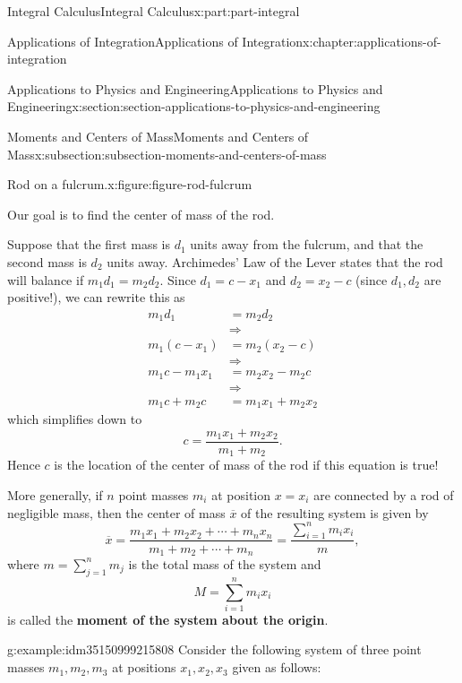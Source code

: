 \documentclass[twoside,10pt,]{tufte-book}
\newcommand{\terminology}[1]{\textbf{#1}}
\numberwithin{equation}{part}
\newcommand{\amp}{&}
\begin{document}
\begin{partptx}{Integral Calculus}{}{Integral Calculus}{}{}{x:part:part-integral}
\begin{chapterptx}{Applications of Integration}{}{Applications of Integration}{}{}{x:chapter:applications-of-integration}
\begin{sectionptx}{Applications to Physics and Engineering}{}{Applications to Physics and Engineering}{}{}{x:section:section-applications-to-physics-and-engineering}
\begin{subsectionptx}{Moments and Centers of Mass}{}{Moments and Centers of Mass}{}{}{x:subsection:subsection-moments-and-centers-of-mass}
\begin{figureptx}{Rod on a fulcrum.}{x:figure:figure-rod-fulcrum}{}
\begin{image}{0}{1}{0}
{
}%
\end{image}%
\tcblower
\end{figureptx}%
Our goal is to find the center of mass of the rod.%
\par
Suppose that the first mass is \(d_{1}\) units away from the fulcrum, and that the second mass is \(d_{2}\) units away. Archimedes' Law of the Lever states that the rod will balance if \(m_{1}d_{1} = m_{2}d_{2}\). Since \(d_{1} = c - x_{1}\) and \(d_{2} = x_{2} - c\) (since \(d_{1},d_{2}\) are positive!), we can rewrite this as%
\begin{align*}
m_{1}d_{1} \amp= m_{2}d_{2}\\
\amp\Rightarrow\\
m_{1}(c-x_{1}) \amp= m_{2}(x_{2}-c)\\
\amp\Rightarrow\\
m_{1}c-m_{1}x_{1} \amp= m_{2}x_{2} - m_{2}c\\
\amp\Rightarrow\\
m_{1}c+m_{2}c \amp= m_{1}x_{1}+m_{2}x_{2}
\end{align*}
which simplifies down to%
\begin{equation*}
c = \frac{m_{1}x_{1}+m_{2}x_{2}}{m_{1}+m_{2}}.
\end{equation*}
Hence \(c\) is the location of the center of mass of the rod if this equation is true!%
\par
More generally, if \(n\) point masses \(m_{i}\) at position \(x=x_{i}\) are connected by a rod of negligible mass, then the center of mass \(\overline{x}\) of the resulting system is given by%
\begin{equation*}
\overline{x} = \frac{m_{1}x_{1}+m_{2}x_{2}+\cdots+m_{n}x_{n}}{m_{1}+m_{2}+\cdots+m_{n}} = \frac{\sum_{i=1}^{n}m_{i}x_{i}}{m},
\end{equation*}
where \(m = \sum_{j=1}^{n}m_{j}\) is the total mass of the system and%
\begin{equation*}
M = \sum_{i=1}^{n}m_{i}x_{i}
\end{equation*}
is called the \terminology{moment of the system about the origin}.%
\begin{example}{}{g:example:idm35150999215808}%
Consider the following system of three point masses \(m_{1},m_{2},m_{3}\) at positions \(x_{1},x_{2},x_{3}\) given as follows:%

\end{example}
\end{subsectionptx}
\end{sectionptx}
\end{chapterptx}
\end{partptx}
\end{document}
